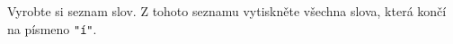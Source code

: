 \question[30]
Vyrobte si seznam slov. Z tohoto seznamu vytiskněte všechna slova, která končí
na písmeno \texttt{"í"}.